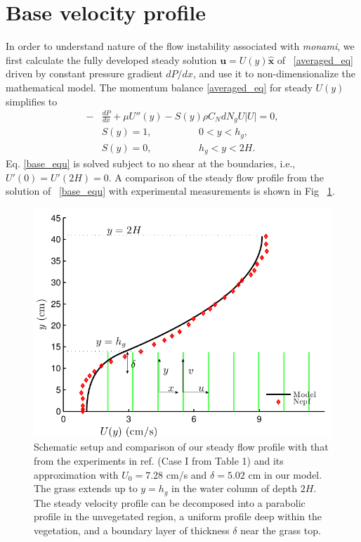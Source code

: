 \documentclass[12pt]{report}   %
\newcommand{\bu}{\mathbf{u}}
\newcommand{\hg}{h_g}
\newcommand{\monami}{\textit{monami}}
\begin{document}
\section{Base velocity profile}
In order to understand nature of the flow instability associated with \monami, we first calculate the fully developed steady solution $\bu = U(y)\boldsymbol{\hat{x}}$ of ~\eqref{averaged_eq} driven by constant pressure gradient $dP/dx$, and use it to non-dimensionalize the mathematical model. The momentum balance \eqref{averaged_eq} for steady $U(y)$ simplifies to
\begin{equation}
\begin{split}
 -&\frac{dP}{dx}+\mu U''(y) -S(y) \rho C_N d N_gU |U| =0,\\
 &S(y) = 1, \hspace{2cm} 0<y<\hg,\\
 &S(y) = 0, \hspace{2cm} \hg< y< 2H.
\label{base_equ}
\end{split}
\end{equation}
Eq. \eqref{base_equ} is solved subject to no shear at the boundaries, i.e., $U'(0) = U'(2H) = 0$.
A comparison of the steady flow profile from the solution of ~\eqref{base_equ} with experimental measurements is shown in Fig ~\ref{basicflow}.
\begin{figure}
\centerline{\includegraphics[scale=.99]{Grass_Base_Nepf} }
\caption[Comparison of experimentally measured mean velocity profile with the prediction of mathematical model]{
Schematic setup and comparison of our steady flow profile with that from the experiments in ref. \cite{Nepf04} (Case I from Table 1) %
 and its approximation with $U_0=7.28$ cm/s and $\delta = 5.02$ cm in our model. The grass extends up to $y=\hg$ in the water column of depth $2H$. 
The steady velocity profile can be decomposed into a parabolic profile in the unvegetated region, a uniform profile deep within the vegetation, and a boundary layer of thickness $\delta$ near the grass top. 
}
\label{basicflow}
\end{figure}
\end{document}
